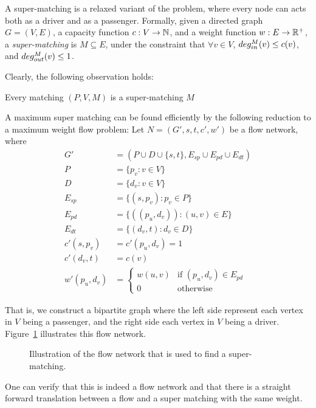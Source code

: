 A super-matching is a relaxed variant of the \CARPOOL{} problem, 
where every node can acts both as a driver and as a passenger. 
Formally, given a directed graph $G = (V, E)$, 
a capacity function $ c: V \rightarrow \mathbb{N} $,
and a weight function $w : E \rightarrow \mathbb{R^+}$,
a \emph{super-matching} is $M \subseteq E$, 
under the constraint that $\forall v \in V$,
$deg^M_{in}(v) \leq c(v)$, and $deg^M_{out}(v) \leq 1$. 

Clearly, the following observation holds:
\begin{observation}
Every matching $(P, V, M)$ is a super-matching $M$
\end{observation}

A maximum super matching can be found efficiently by the following reduction 
to a maximum weight flow problem: 
Let $N = (G', s, t, c', w')$ be a flow network, where 
\begin{align*}
G'				& = (P \cup D \cup \{s, t\}, E_{sp} \cup E_{pd} \cup E_{dt})	\\
P				& = \{p_v : v \in V\}					\\
D				& = \{d_v : v \in V\}					\\
E_{sp}			& = \{ (s, p_v) : p_v \in P \}			\\
E_{pd}			& = \{ ((p_u, d_v)) : (u, v) \in E \}	\\
E_{dt}			& = \{ (d_v, t) : d_v \in D \}			\\
c'(s, p_v)		& = c'(p_u, d_v) = 1					\\
c'(d_v, t)		& = c(v)								\\
w'(p_u, d_v)	& = 
\begin{cases}
w(u, v) & \text{if } (p_u, d_v) \in E_{pd} \\
0 & \text{otherwise}	
\end{cases}
\end{align*}

That is, 
we construct a bipartite graph where the left side represent each vertex 
in $V$ being a passenger,
and the right side each vertex in $V$ being a driver.
Figure~\ref{fig:cm-flow} illustrates this flow network.
%
\begin{figure}
\centering

\caption{
\label{fig:cm-flow}
Illustration of the flow network that is used to find a super-matching.
}
\end{figure}
%
One can verify that this is indeed a flow network and that there is a straight forward 
translation between a flow and a super matching with the same weight.
